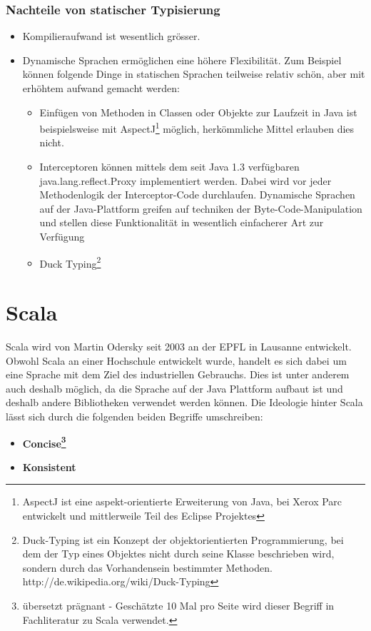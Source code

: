 \subsubsection{Nachteile von statischer Typisierung}
\begin{itemize}
\item Kompilieraufwand ist wesentlich gr\"osser.
\item Dynamische Sprachen erm\"oglichen eine h\"ohere Flexibilit\"at. Zum Beispiel k\"onnen folgende Dinge in statischen Sprachen teilweise relativ sch\"on, aber mit erh\"ohtem aufwand gemacht werden:
\begin{itemize}
\item Einf\"ugen von Methoden in Classen oder Objekte zur Laufzeit in Java ist beispielsweise mit AspectJ\footnote{AspectJ ist eine aspekt-orientierte Erweiterung von Java, bei Xerox Parc entwickelt und mittlerweile Teil des Eclipse Projektes} m\"oglich, herk\"ommliche Mittel erlauben dies nicht.
\item Interceptoren k\"onnen mittels dem seit Java 1.3 verf\"ugbaren java.lang.reflect.Proxy implementiert werden. Dabei wird vor jeder Methodenlogik der Interceptor-Code durchlaufen. Dynamische Sprachen auf der Java-Plattform greifen auf techniken der Byte-Code-Manipulation und stellen diese Funktionalit\"at in wesentlich einfacherer Art zur Verf\"ugung
\item Duck Typing\footnote{Duck-Typing ist ein Konzept der objektorientierten Programmierung, bei dem der Typ eines Objektes nicht durch seine Klasse beschrieben wird, sondern durch das Vorhandensein bestimmter Methoden. http://de.wikipedia.org/wiki/Duck-Typing}
\end{itemize}
\end{itemize}


\section{Scala}\label{einarbeitung:scala}
Scala wird von Martin Odersky seit 2003 an der EPFL in Lausanne entwickelt. Obwohl Scala an einer Hochschule entwickelt wurde, handelt es sich dabei um eine Sprache mit dem Ziel des industriellen Gebrauchs. Dies ist unter anderem auch deshalb m\"oglich, da die Sprache auf der Java Plattform aufbaut ist und deshalb andere Bibliotheken verwendet werden k\"onnen. Die Ideologie hinter Scala l\"asst sich durch die folgenden beiden Begriffe umschreiben:
\begin{itemize}
\item \bf{Concise\footnote{\"ubersetzt pr\"agnant - Gesch\"atzte 10 Mal pro Seite wird dieser Begriff in Fachliteratur zu Scala verwendet.}}
\item \bf{Konsistent}
\end{itemize}

